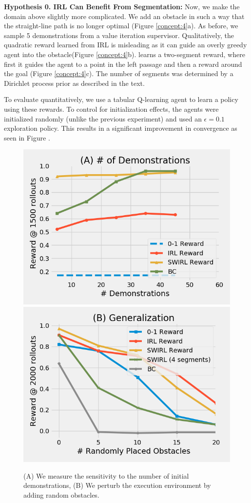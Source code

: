 \vspace{0.5em} \noindent \textbf{Hypothesis 0. IRL Can Benefit From Segmentation: } Now, we make the domain above slightly more complicated. We add an obstacle in such a way that the straight-line path is no longer optimal (Figure \ref{concept:4}a). As before, we sample 5 demonstrations from a value iteration supervisor.
Qualitatively, the quadratic reward learned from IRL is misleading as it can guide an overly greedy agent into the obstacle(Figure \ref{concept:4}b). 
\hirl learns a two-segment reward, where first it guides the agent to a point in the left passage and then a reward around the goal (Figure \ref{concept:4}c).
The number of segments was determined by a Dirichlet process prior as described in the text.

To evaluate \hirl quantitatively, we use a tabular Q-learning agent to learn a policy using these rewards.
To control for initialization effects, the agents were initialized randomly (unlike the previous experiment) and used an $\epsilon=0.1$ exploration policy.
This results in a significant improvement in convergence as seen in Figure \label{concept:5}.

\begin{figure}[t]
\centering
 \includegraphics[width=0.48\columnwidth]{concept/3-1.png}
  \includegraphics[width=0.48\columnwidth]{concept/3-2.png}
 \caption{(A) We measure the sensitivity to the number of initial demonstrations, (B) We perturb the execution environment by adding random obstacles. \label{concept:6}}
\end{figure}


